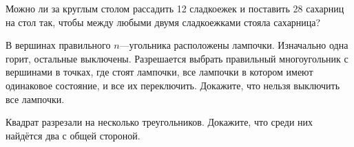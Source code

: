 \documentclass{article}
\begin{document}
\begin{enumerate_boxed}
        \item Можно ли за круглым столом рассадить 12 сладкоежек и поставить 28 сахарниц на стол так, чтобы между любыми двумя сладкоежками стояла сахарница?

        \item В вершинах правильного $ n $—угольника расположены лампочки.
        Изначально одна горит, остальные выключены.
        Разрешается выбрать правильный многоугольник с вершинами в точках, где стоят лампочки, все лампочки в котором имеют одинаковое состояние, и все их переключить.
        Докажите, что нельзя выключить все лампочки.

        \item Квадрат разрезали на несколько треугольников.
        Докажите, что среди них найдётся два с общей стороной.

    \end{enumerate_boxed}
\end{document}
